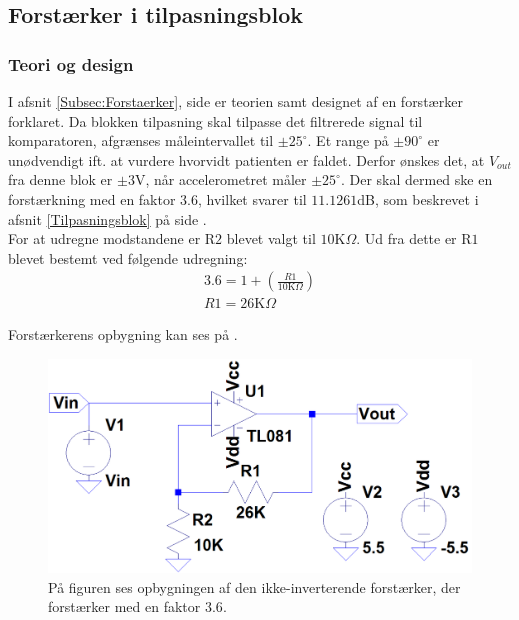 \subsection{Forstærker i tilpasningsblok}\label{Forstaerker_faktor3_afs}
\subsubsection{Teori og design}
I afsnit \ref{Subsec:Forstaerker}, side \pageref{Subsec:Forstaerker} er teorien samt designet af en forstærker forklaret. Da blokken tilpasning skal tilpasse det filtrerede signal til komparatoren, afgrænses måleintervallet til $\pm25^{\circ}$. Et range på $\pm90^{\circ}$ er unødvendigt ift. at vurdere hvorvidt patienten er faldet. Derfor ønskes det, at $V_{out}$ fra denne blok er $\pm3$V, når accelerometret måler $\pm25^{\circ}$. Der skal dermed ske en forstærkning med en faktor $3.6$, hvilket svarer til $11.1261$dB, som beskrevet i afsnit \ref{Tilpasningsblok} på side \pageref{Tilpasningsblok}. \\
For at udregne modstandene er R$2$ blevet valgt til $10$K$\Omega$. Ud fra dette er R$1$ blevet bestemt ved følgende udregning:
\begin{eqnarray}
3.6 = 1 + (\frac{R1}{10\text{K}\Omega}) \\
R1 = 26\text{K}\Omega
\end{eqnarray}

\noindent Forstærkerens opbygning kan ses på .
\begin{figure}[H]
	\centering
	\includegraphics[scale=0.35]{figures/cProblemloesning/Forstaerker_faktor3.PNG}
	\caption{På figuren ses opbygningen af den ikke-inverterende forstærker, der forstærker med en faktor $3.6$.}
	\label{fig:Forstaerker_faktor3}
\end{figure}

